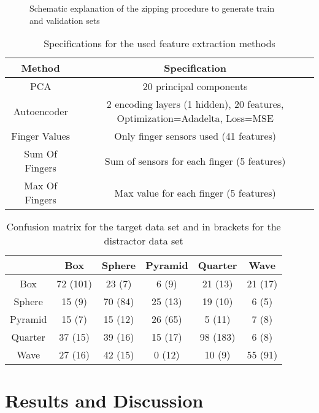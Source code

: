 \begin{figure}[h]
	\caption{Schematic explanation of the zipping procedure to generate train and validation sets}
	\label{zip}
\end{figure}

\begin{table}[H]
\centering
\begin{tabular}{|c|c|}
\hline
Method & Specification \\
\hline\hline
PCA & 20 principal components \\
Autoencoder & 2 encoding layers (1 hidden), 20 features, Optimization=Adadelta, Loss=MSE\\
Finger Values & Only finger sensors used (41 features) \\
Sum Of Fingers & Sum of sensors for each finger (5 features) \\
Max Of Fingers & Max value for each finger (5 features) \\
\hline
\end{tabular}
\caption{Specifications for the used feature extraction methods}
\label{FE}
\end{table} 

\begin{table}[H]
	\centering
	\begin{tabular}{|c||c|c|c|c|c|}
		\hline
		 & Box & Sphere & Pyramid & Quarter & Wave \\
		\hline\hline
		Box & 72 (101) & 23 (7) & 6 (9) & 21 (13) & 21 (17) \\
		Sphere & 15 (9)& 70 (84) & 25 (13) & 19 (10) & 6 (5)\\
		Pyramid & 15 (7)& 15  (12)& 26 (65)& 5 (11)& 7 (8)\\
		Quarter & 37 (15)& 39 (16)& 15 (17)& 98 (183)& 6 (8)\\
		Wave & 27 (16)& 42 (15)& 0 (12)& 10 (9)& 55 (91)\\
		\hline
	\end{tabular}
	\caption{Confusion matrix for the target data set and in brackets for the distractor data set}
	\label{Confusion}
\end{table} 
\section{Results and Discussion} \label{results}
